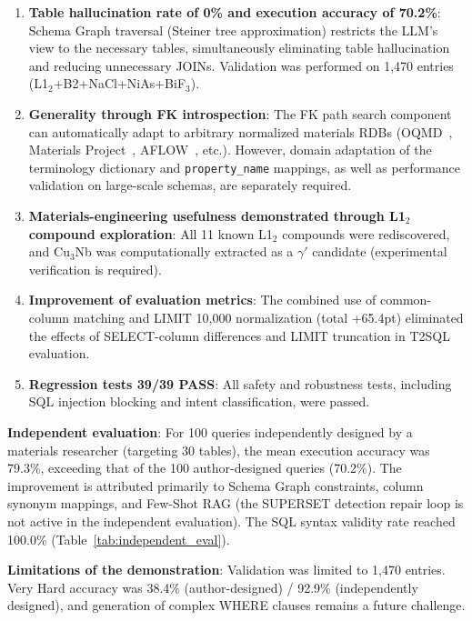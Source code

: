 \documentclass[5p,twocolumn]{elsarticle}
\begin{document}
\begin{enumerate}
  \item \textbf{Table hallucination rate of 0\% and execution accuracy of 70.2\%}:
    Schema Graph traversal (Steiner tree approximation) restricts the LLM's view to the necessary tables,
    simultaneously eliminating table hallucination and reducing unnecessary JOINs.
    Validation was performed on 1{,}470 entries (L1$_2$+B2+NaCl+NiAs+BiF$_3$).
  \item \textbf{Generality through FK introspection}:
    The FK path search component can automatically adapt to arbitrary normalized materials RDBs (OQMD~\citep{saal2013oqmd}, Materials Project~\citep{jain2013mp}, AFLOW~\citep{curtarolo2012aflow}, etc.).
    However, domain adaptation of the terminology dictionary and \texttt{property\_name} mappings, as well as performance validation on large-scale schemas, are separately required.
  \item \textbf{Materials-engineering usefulness demonstrated through L1$_2$ compound exploration}:
    All 11 known L1$_2$ compounds were rediscovered,
    and Cu$_3$Nb was computationally extracted as a $\gamma'$ candidate (experimental verification is required).
  \item \textbf{Improvement of evaluation metrics}:
    The combined use of common-column matching and LIMIT 10{,}000 normalization (total +65.4pt)
    eliminated the effects of SELECT-column differences and LIMIT truncation in T2SQL evaluation.
  \item \textbf{Regression tests 39/39 PASS}:
    All safety and robustness tests, including SQL injection blocking and intent classification,
    were passed.
\end{enumerate}

\textbf{Independent evaluation}:
For 100 queries independently designed by a materials researcher (targeting 30 tables),
the mean execution accuracy was 79.3\%, exceeding that of the 100 author-designed queries (70.2\%).
The improvement is attributed primarily to Schema Graph constraints, column synonym mappings, and Few-Shot RAG
(the SUPERSET detection repair loop is not active in the independent evaluation).
The SQL syntax validity rate reached 100.0\% (Table~\ref{tab:independent_eval}).

\textbf{Limitations of the demonstration}:
Validation was limited to 1{,}470 entries.
Very Hard accuracy was 38.4\% (author-designed) / 92.9\% (independently designed),
and generation of complex WHERE clauses remains a future challenge.
\end{document}
